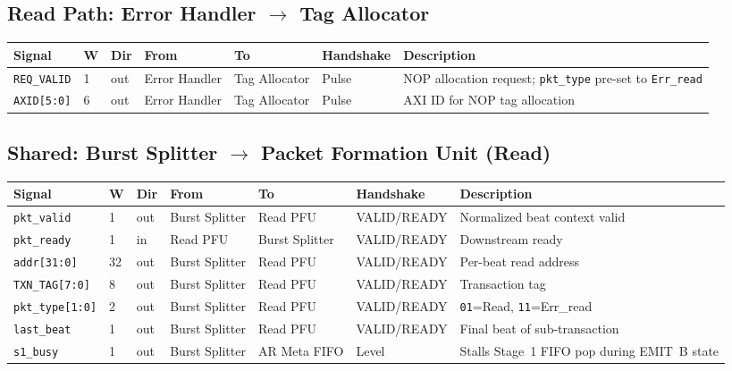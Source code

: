 \documentclass[11pt,a4paper]{article}
\begin{document}
\subsection{Read Path: Error Handler $\rightarrow$ Tag Allocator}

\begin{tabularx}{\textwidth}{L{3.0cm} C{0.8cm} C{1.0cm} L{2.2cm} L{2.2cm} L{2.0cm} X}
\toprule
\textbf{Signal} & \textbf{W} & \textbf{Dir} & \textbf{From} & \textbf{To} & \textbf{Handshake} & \textbf{Description} \\
\midrule
\texttt{REQ\_VALID}    & 1 & out & Error Handler & Tag Allocator & Pulse & NOP allocation request; \texttt{pkt\_type} pre-set to \texttt{Err\_read} \\
\texttt{AXID[5:0]}     & 6 & out & Error Handler & Tag Allocator & Pulse & AXI ID for NOP tag allocation \\
\bottomrule
\end{tabularx}

\subsection{Shared: Burst Splitter $\rightarrow$ Packet Formation Unit (Read)}

\begin{tabularx}{\textwidth}{L{3.0cm} C{0.8cm} C{1.0cm} L{2.2cm} L{2.2cm} L{2.0cm} X}
\toprule
\textbf{Signal} & \textbf{W} & \textbf{Dir} & \textbf{From} & \textbf{To} & \textbf{Handshake} & \textbf{Description} \\
\midrule
\texttt{pkt\_valid}      & 1  & out & Burst Splitter & Read PFU  & VALID/READY & Normalized beat context valid \\
\texttt{pkt\_ready}      & 1  & in  & Read PFU       & Burst Splitter & VALID/READY & Downstream ready \\
\texttt{addr[31:0]}      & 32 & out & Burst Splitter & Read PFU  & VALID/READY & Per-beat read address \\
\texttt{TXN\_TAG[7:0]}   & 8  & out & Burst Splitter & Read PFU  & VALID/READY & Transaction tag \\
\texttt{pkt\_type[1:0]}  & 2  & out & Burst Splitter & Read PFU  & VALID/READY & \texttt{01}=Read, \texttt{11}=Err\_read \\
\texttt{last\_beat}      & 1  & out & Burst Splitter & Read PFU  & VALID/READY & Final beat of sub-transaction \\
\texttt{s1\_busy}        & 1  & out & Burst Splitter & AR Meta FIFO & Level & Stalls Stage~1 FIFO pop during EMIT~B state \\
\bottomrule
\end{tabularx}
\end{document}
